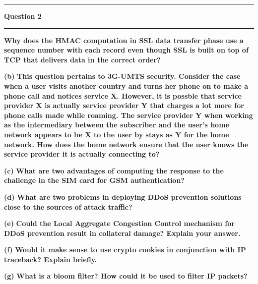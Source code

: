 \documentclass[11pt]{article}
\newcommand\question[2]{\vspace{.25in}\hrule\textbf{#1}\vspace{.5em}\hrule\vspace{.10in}}
\renewcommand\part[1]{\vspace{.10in}\textbf{(#1)}}
\begin{document}
\question{Question 2}

\part{a} \textbf{Why does the HMAC computation in SSL data transfer phase use a sequence number with each record even though SSL is built on top of TCP that delivers data in the correct order?}

\part{b} \textbf{This question pertains to 3G-UMTS security. Consider the case when a user visits another country and turns her phone on to make a phone call and notices service X. However, it is possble that service provider X is actually service provider Y that charges a lot more for phone calls made while roaming. The service provider Y when working as the intermediary between the subscriber and the user's home network appears to be X to the user by stays as Y for the home network. How does the home network ensure that the user knows the service provider it is actually connecting to?}

\part{c} \textbf{What are two advantages of computing the response to the challenge in the SIM card for GSM authentication?}

\part{d} \textbf{What are two problems in deploying DDoS prevention solutions close to the sources of attack traffic?}

\part{e} \textbf{Could the Local Aggregate Congestion Control mechanism for DDoS prevention result in collateral damage? Explain your answer.}

\part{f} \textbf{Would it make sense to use crypto cookies in conjunction with IP traceback? Explain briefly.}

\part{g} \textbf{What is a bloom filter? How could it be used to filter IP packets?}
\end{document}
